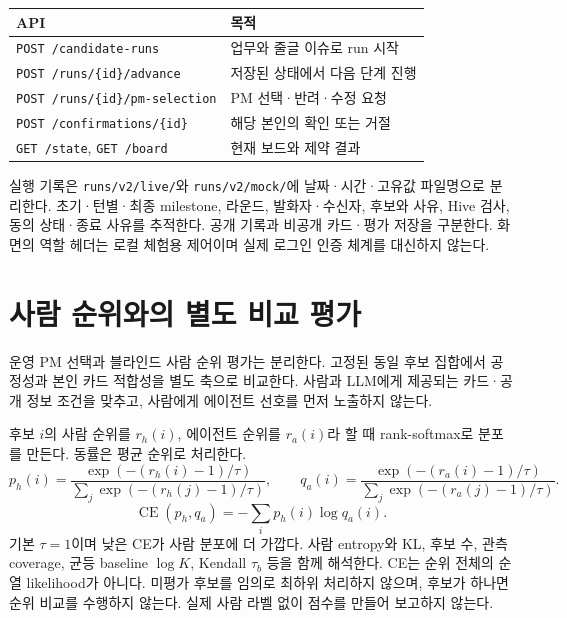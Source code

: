 \documentclass[11pt,a4paper]{article}
\begin{document}
\begin{tabularx}{\linewidth}{@{}p{69mm}Y@{}}\toprule
API & 목적\\\midrule
\texttt{POST /candidate-runs} & 업무와 줄글 이슈로 run 시작\\
\texttt{POST /runs/\{id\}/advance} & 저장된 상태에서 다음 단계 진행\\
\texttt{POST /runs/\{id\}/pm-selection} & PM 선택·반려·수정 요청\\
\texttt{POST /confirmations/\{id\}} & 해당 본인의 확인 또는 거절\\
\texttt{GET /state}, \texttt{GET /board} & 현재 보드와 제약 결과\\\bottomrule
\end{tabularx}

실행 기록은 \texttt{runs/v2/live/}와 \texttt{runs/v2/mock/}에 날짜·시간·고유값 파일명으로 분리한다. 초기·턴별·최종 milestone, 라운드, 발화자·수신자, 후보와 사유, Hive 검사, 동의 상태·종료 사유를 추적한다. 공개 기록과 비공개 카드·평가 저장을 구분한다. 화면의 역할 헤더는 로컬 체험용 제어이며 실제 로그인 인증 체계를 대신하지 않는다.

\newpage
\section{사람 순위와의 별도 비교 평가}
운영 PM 선택과 블라인드 사람 순위 평가는 분리한다. 고정된 동일 후보 집합에서 공정성과 본인 카드 적합성을 별도 축으로 비교한다. 사람과 LLM에게 제공되는 카드·공개 정보 조건을 맞추고, 사람에게 에이전트 선호를 먼저 노출하지 않는다.

후보 $i$의 사람 순위를 $r_h(i)$, 에이전트 순위를 $r_a(i)$라 할 때 rank-softmax로 분포를 만든다. 동률은 평균 순위로 처리한다.
\[
p_h(i)=\frac{\exp(-(r_h(i)-1)/\tau)}{\sum_j\exp(-(r_h(j)-1)/\tau)},\qquad
q_a(i)=\frac{\exp(-(r_a(i)-1)/\tau)}{\sum_j\exp(-(r_a(j)-1)/\tau)}.
\]
\[
\operatorname{CE}(p_h,q_a)=-\sum_i p_h(i)\log q_a(i).
\]
기본 $\tau=1$이며 낮은 CE가 사람 분포에 더 가깝다. 사람 entropy와 KL, 후보 수, 관측 coverage, 균등 baseline $\log K$, Kendall $\tau_b$ 등을 함께 해석한다. CE는 순위 전체의 순열 likelihood가 아니다. 미평가 후보를 임의로 최하위 처리하지 않으며, 후보가 하나면 순위 비교를 수행하지 않는다. 실제 사람 라벨 없이 점수를 만들어 보고하지 않는다.
\end{document}
